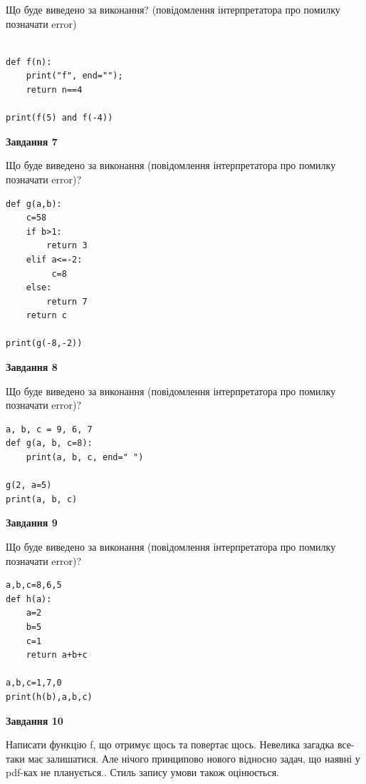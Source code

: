 \documentclass[12pt, ukrainian]{article}
\begin{document}
{\begin {large}
Що буде виведено за виконання? (повідомлення інтерпретатора про помилку позначати error)\par
\begin{verbatim}

def f(n):
    print("f", end="");
    return n==4

print(f(5) and f(-4))
\end{verbatim}

{\begin {center}\textbf{Завдання 7}\end {center}}

Що буде виведено за виконання (повідомлення інтерпретатора про помилку позначати error)?\par
\begin{verbatim}
def g(a,b):
    c=58
    if b>1:
        return 3
    elif a<=-2:
         c=8
    else: 
        return 7
    return c

print(g(-8,-2))
\end{verbatim}

{\begin {center}\textbf{Завдання 8}\end {center}}

Що буде виведено за виконання (повідомлення інтерпретатора про помилку позначати error)?\par
\begin{verbatim}
a, b, c = 9, 6, 7
def g(a, b, c=8):
    print(a, b, c, end=" ")

g(2, a=5)
print(a, b, c)
\end{verbatim}

{\begin {center}\textbf{Завдання 9}\end {center}}

Що буде виведено за виконання (повідомлення інтерпретатора про помилку позначати error)?\par
\begin{verbatim}
a,b,c=8,6,5
def h(a):
    a=2
    b=5
    c=1
    return a+b+c

a,b,c=1,7,0
print(h(b),a,b,c)
\end{verbatim}

{\begin {center}\textbf{Завдання 10}\end {center}}


Написати функцiю f, що отримує щось та повертає щось. Невелика загадка все-таки має залишатися. Але нічого принципово нового відносно задач, що наявні у pdf-ках не планується.. Стиль запису умови також оцінюється.\par
\end {large}}
\newpage
\end{document}
